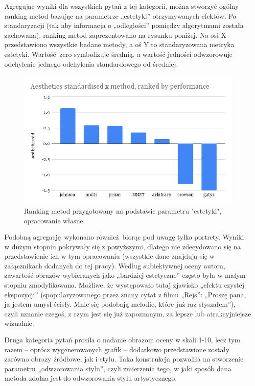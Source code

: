 \documentclass[12pt]{article}
\begin{document}
Agregując wyniki dla wszystkich pytań z tej kategorii, można stworzyć ogólny ranking metod bazując na parametrze „estetyki” otrzymywanych efektów. Po standaryzacji (tak aby informacja o „odległości” pomiędzy algorytmami została zachowana), ranking metod zaprezentowano na rysunku poniżej. Na osi X przedstawiono wszystkie badane metody, a oś Y to standaryzowana metryka estetyki. Wartość zero symbolizuje średnią, a wartość jedności odwzorowuje odchylenie jednego odchylenia standardowego od średniej.

\begin{figure}[H]
    \centering
    \includegraphics[scale=0.55]{p3}
    \caption{Ranking metod przygotowany na podstawie parametru "estetyki", opracowanie własne.}
    \label{fig:20}
\end{figure}


Podobną agregację wykonano również biorąc pod uwagę tylko portrety. Wyniki w dużym stopniu pokrywały się z powyższymi, dlatego nie zdecydowano się na przedstawienie ich w tym opracowaniu (wszystkie dane znajdują się w załącznikach dodanych do tej pracy). Według subiektywnej oceny autora, zawartość obrazów wybieranych jako „bardziej estetyczne” często była w małym stopniu zmodyfikowana. Możliwe, że występowało tutaj zjawisko „efektu czystej ekspozycji” (spopularyzowanego przez znany cytat z filmu „Rejs”: „Proszę pana, ja jestem umysł ścisły. Mnie się podobają melodie, które już raz słyszałem”), czyli uznanie czegoś, z czym jest się już zapoznanym, za lepsze lub atrakcyjniejsze wizualnie.

Druga kategoria pytań prosiła o nadanie obrazom oceny w skali 1-10, lecz tym razem – oprócz wygenerowanych grafik – dodatkowo przedstawione zostały zarówno obrazy źródłowe, jak i stylu. Taka konstrukcja pozwoliła na stworzenie parametru „odwzorowania stylu”, czyli zmierzenia tego, w jaki sposób dana metoda zdolna jest do odwzorowania stylu artystycznego.
\end{document}
